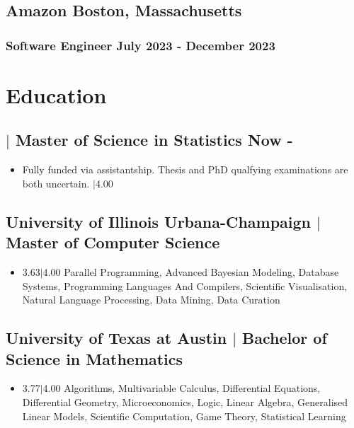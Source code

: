 \documentclass[11pt]{article}
\begin{document}
\vspace{1ex}

\subsection{Amazon \hfill \normalfont Boston, Massachusetts}
\subsubsection{Software Engineer \hfill \normalfont July 2023 - December 2023}

\vspace{2ex}

\section{Education}
\subsection{ $|$ {\normalfont Master of Science in Statistics} \hfill \normalfont Now - }
\begin{itemize}
  \item Fully funded via assistantship. Thesis and PhD qualfying examinations are both uncertain. $|$4.00
\end{itemize}

\vspace{1ex}

\subsection{University of Illinois Urbana-Champaign $|$ {\normalfont Master of Computer Science} \hfill {}}
\begin{itemize}
  \item 3.63$|$4.00 Parallel Programming, Advanced Bayesian Modeling, Database Systems, Programming Languages And Compilers, Scientific Visualisation, Natural Language Processing, Data Mining, Data Curation
\end{itemize}

\vspace{1ex}

\subsection{University of Texas at Austin $|$ {\normalfont Bachelor of Science in Mathematics} \hfill {}}
\begin{itemize}
  \item 3.77$|$4.00 Algorithms, Multivariable Calculus, Differential Equations, Differential Geometry, Microeconomics, Logic, Linear Algebra, Generalised Linear Models, Scientific Computation, Game Theory, Statistical Learning
\end{itemize}
\end{document}

